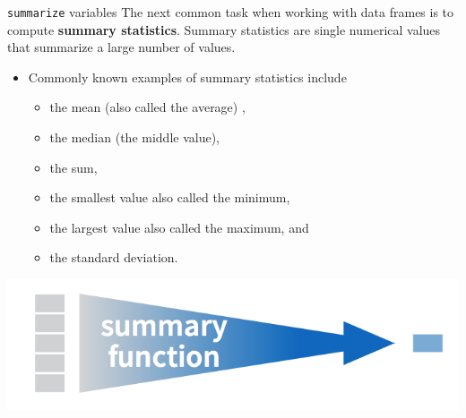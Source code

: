 \documentclass[
  ignorenonframetext,
]{beamer}
\providecommand{\tightlist}{%
  \setlength{\itemsep}{0pt}\setlength{\parskip}{0pt}}
\begin{document}
\begin{frame}{\texttt{summarize} variables}
\protect\hypertarget{summarize-variables}{}
The next common task when working with data frames is to compute
\textbf{summary statistics}. Summary statistics are single numerical
values that summarize a large number of values.

\begin{itemize}
\item
  Commonly known examples of summary statistics include

  \begin{itemize}
  \tightlist
  \item
    the mean (also called the average) ,
  \item
    the median (the middle value),
  \item
    the sum,
  \item
    the smallest value also called the minimum,
  \item
    the largest value also called the maximum, and
  \item
    the standard deviation.
  \end{itemize}
\end{itemize}

\begin{center}\includegraphics[width=0.6\linewidth,height=0.2\textheight]{week3_2} \end{center}
\end{frame}
\end{document}
